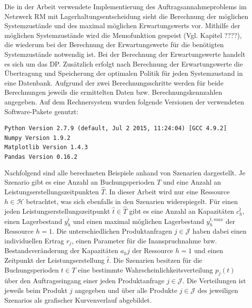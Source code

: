Die in der Arbeit verwendete Implementierung des Auftragsannahmeproblems im Netzwerk RM mit Lagerhaltungsentscheidung sieht die Berechnung der möglichen Systemzustände und des maximal möglichen Erwartungswerts vor. Mithilfe der möglichen Systemzustände wird die Memofunktion gespeist (Vgl. Kapitel ????), die wiederum bei der Berechnung der Erwartungswerte für die benötigten Systemzustände notwendig ist. Bei der Berechnung der Erwartungswerte handelt es sich um das DP. Zusätzlich erfolgt nach Berechnung der Erwartungswerte die Übertragung und Speicherung der optimalen Politik für jeden Systemzustand in eine Datenbank. Aufgrund der zwei Berechnungsschritte werden für beide Berechnungen jeweils die ermittelten Daten bzw. Berechnungskennzahlen angegeben.  Auf dem Rechnersystem wurden folgende Versionen der verwendeten Software-Pakete genutzt:

\colorbox{hellgrau}{\parbox{14cm}{\texttt{Python Version 2.7.9 (default, Jul  2 2015, 11:24:04) [GCC 4.9.2]\\
Numpy Version 1.9.2\\
Matplotlib Version 1.4.3\\
Pandas Version 0.16.2
}}}

Nachfolgend sind alle berechneten Beispiele anhand von Szenarien dargestellt. Je Szenario gibt es eine Anzahl an Buchungsperioden $T$ und eine Anzahl an Leistungserstellungszeitpunkten $\hat T$. In dieser Arbeit wird nur eine Ressource $h\in\mathcal{H}$ betrachtet, was sich ebenfalls in den Szenarien widerspiegelt. Für einen jeden Leistungserstellungszeitpunkt $\hat t \in \hat T$ gibt es eine Anzahl an Kapazitäten $c_h^{\hat t}$, einen Lagerbestand $y_h^{\hat t}$ und einen maximal möglichen Lagerbestand $y_h^{{\hat t},max}$ der Ressource $h=1$. Die unterschiedlichen Produktanfragen $j\in\mathcal{J}$ haben dabei einen individuellen Ertrag $r_j$, einen Parameter für die Inanspruchnahme bzw. Bestandsveränderung der Kapazitäten $a_hj$ der Ressource $h=1$ und einen Zeitpunkt der Leistungserstellung $\hat t$. Die Szenarien besitzen für die Buchungsperioden $t\in T$ eine bestimmte Wahrscheinlichkeitsverteilung $p_j(t)$ über den Auftragseingang einer jeden Produktanfrage $j\in\mathcal{J}$. Die Verteilungen ist jeweils beim Produkt $j$ angegeben und über alle Produkte $j\in\mathcal{J}$ des jeweiligen Szenarios als grafischer Kurvenverlauf abgebildet.

